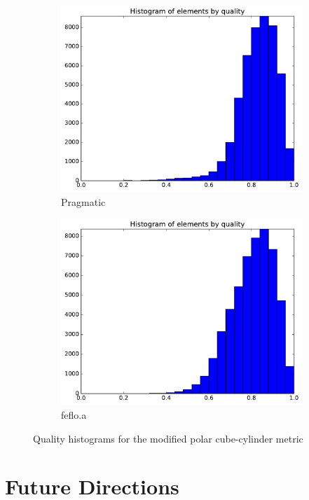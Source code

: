 \documentclass[3p,times,procedia,number]{elsarticle}
\begin{document}
\begin{figure}
\begin{subfigure}{.16\textwidth}
\includegraphics[width=\textwidth]{pragmatic-cube-cylinder-polar-2-quality.pdf}
\caption{Pragmatic}
\end{subfigure}
\begin{subfigure}{.16\textwidth}
\centering
\includegraphics[width=\textwidth]{fefloa-cube-cylinder-polar-2-quality.pdf}
\caption{feflo.a}
\end{subfigure}
\caption{Quality histograms for the modified polar cube-cylinder metric}
\label{fig:cube-cylinder-polar-2-qualities}
\end{figure}


\section{Future Directions}
\end{document}
